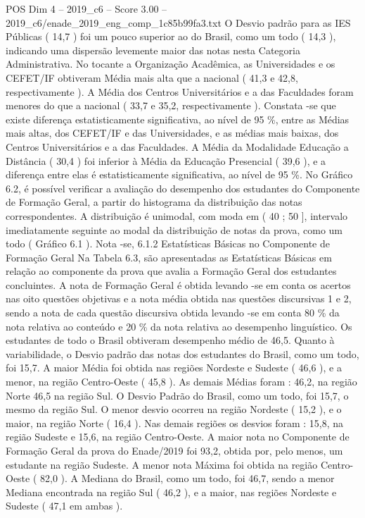 \begin{textsample}{POS Dim 4 – 2019\_c6 – Score 3.00 – 2019\_c6/enade\_2019\_eng\_comp\_1c85b99fa3.txt}
O Desvio padrão para as IES Públicas ( 14,7 ) foi um pouco superior ao do Brasil, como um todo ( 14,3 ), indicando uma dispersão levemente maior das notas nesta Categoria Administrativa.
No tocante a Organização Acadêmica, as Universidades e os CEFET/IF obtiveram Média mais alta que a nacional ( 41,3 e 42,8, respectivamente ).
A Média dos Centros Universitários e a das Faculdades foram menores do que a nacional ( 33,7 e 35,2, respectivamente ).
Constata -se que existe diferença estatisticamente significativa, ao nível de 95 \%, entre as Médias mais altas, dos CEFET/IF e das Universidades, e as médias mais baixas, dos Centros Universitários e a das Faculdades.
A Média da Modalidade Educação a Distância ( 30,4 ) foi inferior à Média da Educação Presencial ( 39,6 ), e a diferença entre elas é estatisticamente significativa, ao nível de 95 \%.
No Gráfico 6.2, é possível verificar a avaliação do desempenho dos estudantes do Componente de Formação Geral, a partir do histograma da distribuição das notas correspondentes.
A distribuição é unimodal, com moda em ( 40 ; 50 ], intervalo imediatamente seguinte ao modal da distribuição de notas da prova, como um todo ( Gráfico 6.1 ).
Nota -se, 6.1.2 Estatísticas Básicas no Componente de Formação Geral Na Tabela 6.3, são apresentadas as Estatísticas Básicas em relação ao componente da prova que avalia a Formação Geral dos estudantes concluintes.
A nota de Formação Geral é obtida levando -se em conta os acertos nas oito questões objetivas e a nota média obtida nas questões discursivas 1 e 2, sendo a nota de cada questão discursiva obtida levando -se em conta 80 \% da nota relativa ao conteúdo e 20 \% da nota relativa ao desempenho linguístico.
Os estudantes de todo o Brasil obtiveram desempenho médio de 46,5.
Quanto à variabilidade, o Desvio padrão das notas dos estudantes do Brasil, como um todo, foi 15,7.
A maior Média foi obtida nas regiões Nordeste e Sudeste ( 46,6 ), e a menor, na região Centro-Oeste ( 45,8 ).
As demais Médias foram : 46,2, na região Norte 46,5 na região Sul.
O Desvio Padrão do Brasil, como um todo, foi 15,7, o mesmo da região Sul.
O menor desvio ocorreu na região Nordeste ( 15,2 ), e o maior, na região Norte ( 16,4 ).
Nas demais regiões os desvios foram : 15,8, na região Sudeste e 15,6, na região Centro-Oeste.
A maior nota no Componente de Formação Geral da prova do Enade/2019 foi 93,2, obtida por, pelo menos, um estudante na região Sudeste.
A menor nota Máxima foi obtida na região Centro-Oeste ( 82,0 ).
A Mediana do Brasil, como um todo, foi 46,7, sendo a menor Mediana encontrada na região Sul ( 46,2 ), e a maior, nas regiões Nordeste e Sudeste ( 47,1 em ambas ).

\end{textsample}
